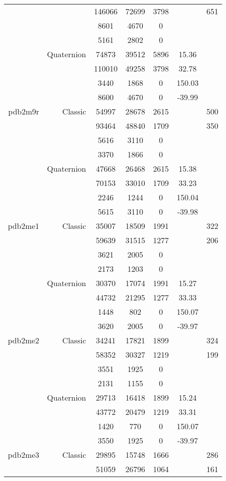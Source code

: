 \begin{xltabular}{\textwidth}{r|rcccSc}
& & 146066 & 72699 & 3798 & & 651 \\
& & 8601 & 4670 & 0 & & \\
& & 5161 & 2802 & 0 & & \\
& Quaternion & 74873 & 39512 & 5896 & 15.36 & \\
& & 110010 & 49258 & 3798 & 32.78 & \\
& & 3440 & 1868 & 0 & 150.03 & \\
& & 8600 & 4670 & 0 & -39.99 & \\ \addlinespace
pdb2m9r & Classic & 54997 & 28678 & 2615 & & 500 \\
& & 93464 & 48840 & 1709 & & 350 \\
& & 5616 & 3110 & 0 & & \\
& & 3370 & 1866 & 0 & & \\
& Quaternion & 47668 & 26468 & 2615 & 15.38 & \\
& & 70153 & 33010 & 1709 & 33.23 & \\
& & 2246 & 1244 & 0 & 150.04 & \\
& & 5615 & 3110 & 0 & -39.98 & \\ \addlinespace
pdb2me1 & Classic & 35007 & 18509 & 1991 & & 322 \\
& & 59639 & 31515 & 1277 & & 206 \\
& & 3621 & 2005 & 0 & & \\
& & 2173 & 1203 & 0 & & \\
& Quaternion & 30370 & 17074 & 1991 & 15.27 & \\
& & 44732 & 21295 & 1277 & 33.33 & \\
& & 1448 & 802 & 0 & 150.07 & \\
& & 3620 & 2005 & 0 & -39.97 & \\ \addlinespace
pdb2me2 & Classic & 34241 & 17821 & 1899 & & 324 \\
& & 58352 & 30327 & 1219 & & 199 \\
& & 3551 & 1925 & 0 & & \\
& & 2131 & 1155 & 0 & & \\
& Quaternion & 29713 & 16418 & 1899 & 15.24 & \\
& & 43772 & 20479 & 1219 & 33.31 & \\
& & 1420 & 770 & 0 & 150.07 & \\
& & 3550 & 1925 & 0 & -39.97 & \\ \addlinespace
pdb2me3 & Classic & 29895 & 15748 & 1666 & & 286 \\
& & 51059 & 26796 & 1064 & & 161 \\

\end{xltabular}
